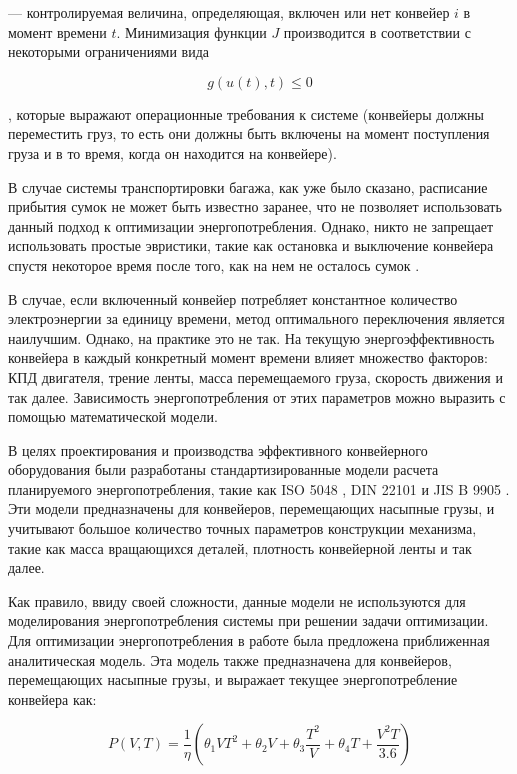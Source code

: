 \documentclass[specification,annotation,times]{itmo-student-thesis}
\theoremstyle{definition}
\begin{document}
--- контролируемая величина, определяющая, включен или нет конвейер $i$ в момент
времени $t$. Минимизация функции $J$ производится в соответствии с некоторыми
ограничениями вида

\begin{equation}\label{energy:opt-switching-g}
  g(u(t), t) \leq 0
\end{equation}

, которые выражают операционные требования к системе (конвейеры должны
переместить груз, то есть они должны быть включены на момент поступления груза и
в то время, когда он находится на конвейере).

В случае системы транспортировки багажа, как уже было сказано, расписание
прибытия сумок не может быть известно заранее, что не позволяет использовать
данный подход к оптимизации энергопотребления. Однако, никто не запрещает
использовать простые эвристики, такие как остановка и выключение конвейера
спустя некоторое время после того, как на нем не осталось сумок
\cite{mukhutdinov2019multi}.

В случае, если включенный конвейер потребляет константное количество
электроэнергии за единицу времени, метод оптимального переключения является
наилучшим. Однако, на практике это не так.
На текущую энергоэффективность конвейера в каждый
конкретный момент времени влияет множество факторов: КПД двигателя, трение
ленты, масса перемещаемого груза, скорость движения и так далее. Зависимость
энергопотребления от этих параметров можно выразить с помощью математической
модели.

В целях проектирования и производства эффективного конвейерного
оборудования были разработаны стандартизированные модели расчета планируемого
энергопотребления, такие как ISO 5048 \cite{ISO5048}, DIN 22101 \cite{DIN22101}
и JIS B 9905 \cite{JISB8805}. Эти модели предназначены для конвейеров,
перемещающих насыпные грузы, и учитывают большое количество точных параметров
конструкции механизма, такие как масса вращающихся деталей, плотность
конвейерной ленты и так далее.

Как правило, ввиду своей сложности, данные модели не используются для
моделирования энергопотребления системы при решении задачи оптимизации. Для
оптимизации энергопотребления в работе \cite{zhang2011modeling} была предложена
приближенная аналитическая модель. Эта модель также предназначена для
конвейеров, перемещающих насыпные грузы, и выражает текущее энергопотребление
конвейера как:

\begin{equation}\label{energy:zhang-model}
  P(V, T) = \frac{1}{\eta} \left( \theta_1 VT^2 + \theta_2 V + \theta_3 \frac{T^2}{V}
  + \theta_4 T + \frac{V^2T}{3.6} \right)
\end{equation}
\end{document}
